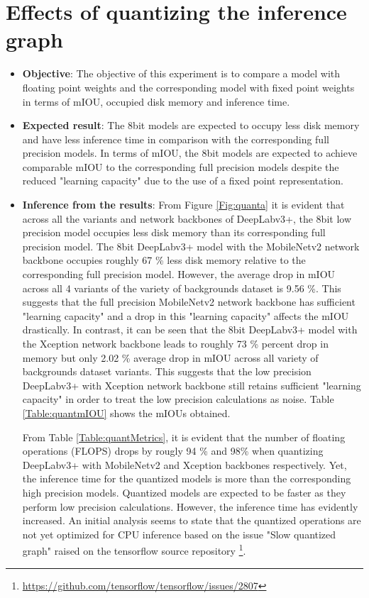 \section{Effects of quantizing the inference graph}
\label{section:quant}
	
	\begin{itemize}
		\item \textbf{Objective}: The objective of this experiment is to compare a model with floating point weights and the corresponding model with fixed point weights in terms of mIOU, occupied disk memory and inference time.
		\item \textbf{Expected result}: The 8bit models are expected to occupy less disk memory and have less inference time in comparison with the corresponding full precision models. In terms of mIOU, the 8bit models are expected to achieve comparable mIOU to the corresponding full precision models despite the reduced "learning capacity" due to the use of a fixed point representation. 
		\item \textbf{Inference from the results}: From Figure \ref{Fig:quanta} it is evident that across all the variants and network backbones of DeepLabv3+, the 8bit low precision model occupies less disk memory than its corresponding full precision model. The 8bit DeepLabv3+ model with the MobileNetv2 network backbone occupies roughly 67 \% less disk memory relative to the corresponding full precision model. However, the average drop in mIOU across all 4 variants of the variety of backgrounds dataset is 9.56 \%. This suggests that the full precision MobileNetv2 network backbone has sufficient "learning capacity" and a drop in this "learning capacity" affects the mIOU drastically. In contrast, it can be seen that the 8bit DeepLabv3+ model with the Xception network backbone leads to roughly 73 \% percent drop in memory but only 2.02 \% average drop in mIOU across all variety of backgrounds dataset variants. This suggests that the low precision DeepLabv3+ with Xception network backbone still retains sufficient "learning capacity" in order to treat the low precision calculations as noise. Table \ref{Table:quantmIOU} shows the mIOUs obtained.	
		
		From Table \ref{Table:quantMetrics}, it is evident that the number of floating operations (FLOPS) drops by rougly 94 \% and 98\% when quantizing DeepLabv3+ with MobileNetv2 and Xception backbones respectively. Yet, the inference time for the quantized models is more than the corresponding high precision models. Quantized models are expected to be faster as they perform low precision calculations. However, the inference time has evidently increased. An initial analysis seems to state that the quantized operations are not yet optimized for CPU inference based on the issue "Slow quantized graph" raised on the tensorflow source repository \footnote{\url{https://github.com/tensorflow/tensorflow/issues/2807}}.
	\end{itemize}
	
